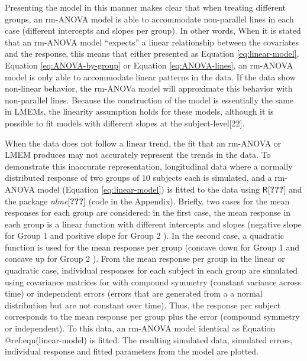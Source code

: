 \documentclass[
]{article}
\begin{document}
Presenting the model in this manner makes clear that when treating different groups, an rm-ANOVA model is able to accommodate non-parallel lines in each case (different intercepts and slopes per group). In other words, When it is stated that an rm-ANOVA model ``expects'' a linear relationship between the covariates and the response, this means that either presented as Equation \eqref{eq:linear-model}, Equation \eqref{eq:ANOVA-by-group} or Equation \eqref{eq:ANOVA-lines}, an rm-ANOVA model is only able to accommodate linear patterns in the data. If the data show non-linear behavior, the rm-ANOVa model will approximate this behavior with non-parallel lines. Because the construction of the model is essentially the same in LMEMs, the linearity assumption holds for these models, although it is possible to fit models with different slopes at the subject-level{[}22{]}.

When the data does not follow a linear trend, the fit that an rm-ANOVA or LMEM produces may not accurately represent the trends in the data. To demonstrate this inaccurate representation, longitudinal data where a normally distributed response of two groups of 10 subjects each is simulated, and a rm-ANOVA model (Equation \eqref{eq:linear-model}) is fitted to the data using \(\textsf{R}\){[}{\textbf{???}}{]} and the package \emph{nlme}{[}{\textbf{???}}{]} (code in the Appendix). Briefly, two cases for the mean responses for each group are considered: in the first case, the mean response in each group is a linear function with different intercepts and slopes (negative slope for Group 1 and positive slope for Group 2 ). In the second case, a quadratic function is used for the mean response per group (concave down for Group 1 and concave up for Group 2 ). From the mean response per group in the linear or quadratic case, individual responses for each subject in each group are simulated using covariance matrices for with compound symmetry (constant variance across time) or independent errors (errors that are generated from a a normal distribution but are not constant over time). Thus, the response per subject corresponds to the mean response per group plus the error (compound symmetry or independent). To this data, an rm-ANOVA model identical as Equation @ref:eqn(linear-model) is fitted. The resulting simulated data, simulated errors, individual response and fitted parameters from the model are plotted.
\end{document}

